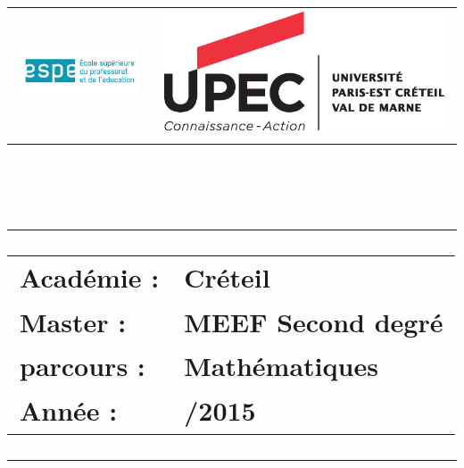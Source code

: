 \newlength{\larg}
\setlength{\larg}{\linewidth}


\title{
\begin{tabular}{lr}
\begin{minipage}{.25\linewidth}
\includegraphics[scale=.35]{../PICS/espe}
\end{minipage}
&
\begin{minipage}{.25\linewidth}
\includegraphics[scale=.35]{../PICS/upec}
\end{minipage}
\end{tabular}\\
{\rule{\larg}{1mm}}\vspace{7mm}
\begin{center}
\begin{tabular}{ll}
  {\sc Académie : } & {\sc Créteil} \\
  {\sc Master : }   & {\sc MEEF Second degré} \\
  {\sc parcours : } & {\sc Mathématiques}\\
  {\sc Année : }    & {\sc 2014/2015}\\        
\end{tabular}
\end{center}
{\rule{\larg}{1mm}}\vspace{.7mm}
}
